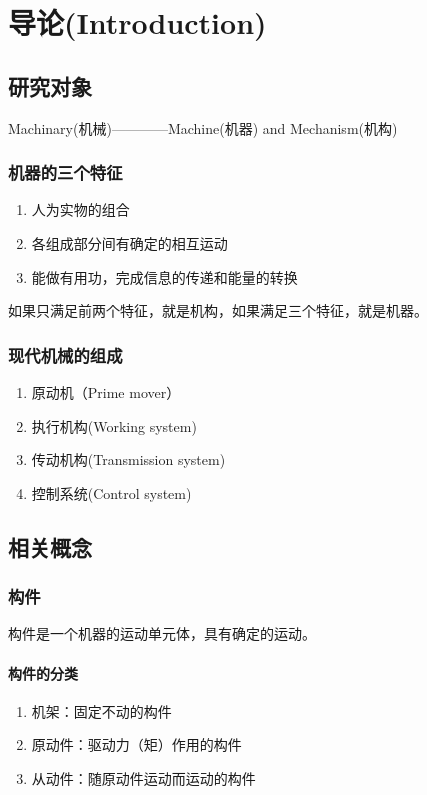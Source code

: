 \chapter{导论(Introduction)}

\section{研究对象}
{\Huge{Machinary(机械)}}————Machine(机器) and Mechanism(机构)

\subsection{机器的三个特征}
\begin{enumerate}
    \item 人为实物的组合
    \item 各组成部分间有确定的相互运动
    \item 能做有用功，完成信息的传递和能量的转换
\end{enumerate}
\begin{remark}
	如果只满足前两个特征，就是机构，如果满足三个特征，就是机器。
\end{remark}

\subsection{现代机械的组成}
\begin{enumerate}
    \item 原动机（Prime mover）
    \item 执行机构(Working system)
    \item 传动机构(Transmission system)
    \item 控制系统(Control system)
\end{enumerate}

\section{相关概念}
\subsection{构件}
\begin{definition}[构件]
    构件是一个机器的运动单元体，具有确定的运动。
\end{definition}
\subsubsection{构件的分类}
\begin{enumerate}
    \item 机架：固定不动的构件
    \item 原动件：驱动力（矩）作用的构件
    \item 从动件：随原动件运动而运动的构件
\end{enumerate}

